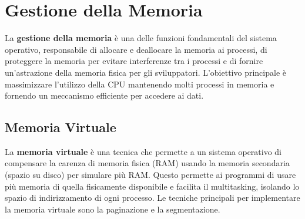 \section{Gestione della Memoria}
La \textbf{gestione della memoria} è una delle funzioni fondamentali del sistema operativo, responsabile di allocare e deallocare la memoria ai processi, di proteggere la memoria per evitare interferenze tra i processi e di fornire un'astrazione della memoria fisica per gli sviluppatori. L'obiettivo principale è massimizzare l'utilizzo della CPU mantenendo molti processi in memoria e fornendo un meccanismo efficiente per accedere ai dati.

\subsection{Memoria Virtuale}
La \textbf{memoria virtuale} è una tecnica che permette a un sistema operativo di compensare la carenza di memoria fisica (RAM) usando la memoria secondaria (spazio su disco) per simulare più RAM. Questo permette ai programmi di usare più memoria di quella fisicamente disponibile e facilita il multitasking, isolando lo spazio di indirizzamento di ogni processo. Le tecniche principali per implementare la memoria virtuale sono la paginazione e la segmentazione.

